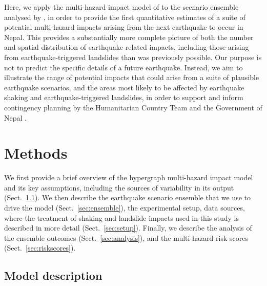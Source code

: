 \documentclass[nhess, manuscript]{copernicus}
\begin{document}
Here, we apply the multi-hazard impact model of \citet{Dunant2025} to the scenario ensemble analysed by \citet{Robinson2018}, in order to provide the first quantitative estimates of a suite of potential multi-hazard impacts arising from the next earthquake to occur in Nepal. This provides a substantially more complete picture of both the number and spatial distribution of earthquake-related impacts, including those arising from earthquake-triggered landslides than was previously possible. Our purpose is not to predict the specific details of a future earthquake. Instead, we aim to illustrate the range of potential impacts that could arise from a suite of plausible earthquake scenarios, and the areas most likely to be affected by earthquake shaking and earthquake-triggered landslides, in order to support and inform contingency planning by the Humanitarian Country Team and the Government of Nepal \citep{sijapati2025}.

\section{Methods}
\label{sec:methods}
We first provide a brief overview of the hypergraph multi-hazard impact model and its key assumptions, including the sources of variability in its output (Sect.~\ref{sec:model}). We then describe the earthquake scenario ensemble that we use to drive the model (Sect.~\ref{sec:ensemble}), the experimental setup, data sources, where the treatment of shaking and landslide impacts used in this study is described in more detail (Sect.~\ref{sec:setup}). Finally, we describe the analysis of the ensemble outcomes (Sect.~\ref{sec:analysis}), and the multi-hazard risk scores (Sect.~\ref{sec:riskscores}).

\subsection{Model description}
\label{sec:model}
\end{document}

